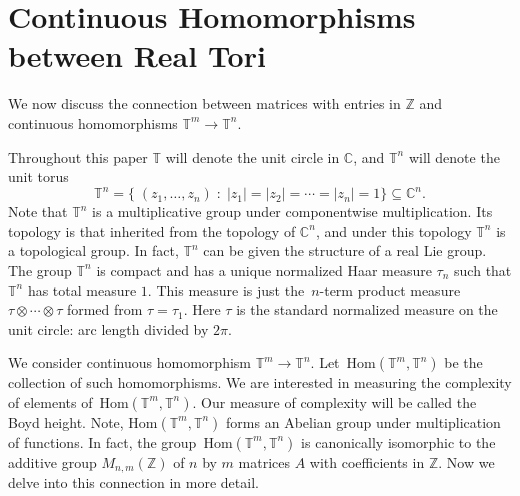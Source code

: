 \documentclass[12pt]{amsart}
\theoremstyle{plain}
\theoremstyle{definition}
\theoremstyle{remark}
\numberwithin{theorem}{section}
\numberwithin{equation}{section} %
\newcommand{\bZ}{{\mathbb{Z}}}
\newcommand{\bC}{{\mathbb{C}}}
\newcommand{\torus}{{\mathbb{T}}}
\begin{document}


\section{Continuous Homomorphisms between Real Tori} \label{Section_Homomorphisms}

We now discuss the connection between matrices with entries in $\bZ$ and
continuous homomorphisms $\torus^m \to \torus^n$. 

Throughout this paper $\torus$ will denote the unit circle in $\bC$, and $\torus^n$
will denote the unit torus
$$
\torus^n = \{\; (z_1, \ldots, z_n)  \; \colon 
	 \; |z_1| =|z_2| =  \cdots = |z_n| = 1 \} \subseteq \bC^n.
$$
Note that $\torus^n$ is a multiplicative group under componentwise multiplication.
Its topology is that inherited from the topology of $\bC^n$, and under this
topology $\torus^n$ is a topological group. In fact, $\torus^n$ can be given the structure
of a  real Lie group. The group $\torus^n$ is compact and has a unique normalized
Haar measure $\tau_n$ such that $\torus^n$ has total measure $1$.
This measure is just the~$n$-term product measure $\tau \otimes \cdots \otimes \tau$ formed from $\tau = \tau_1$.
Here $\tau$ is the standard normalized measure on the unit circle: 
arc length divided by $2\pi$.

We consider continuous homomorphism $\torus^m \to \torus^n$. Let~$\mathrm{Hom}(\torus^m, \torus^n)$ be the collection of such homomorphisms. We are interested in measuring the complexity of elements of~$\mathrm{Hom}(\torus^m, \torus^n)$. Our measure of complexity will be called the Boyd height. 
Note, $\mathrm{Hom}(\torus^m, \torus^n)$ forms an Abelian group under multiplication of functions. In fact, 
the group~$\mathrm{Hom}(\torus^m, \torus^n)$
is canonically isomorphic to the additive group $M_{n, m}(\bZ)$ of $n$ by $m$ matrices $A$ with coefficients in $\bZ$. Now we delve into this connection in more detail. 
\end{document}
